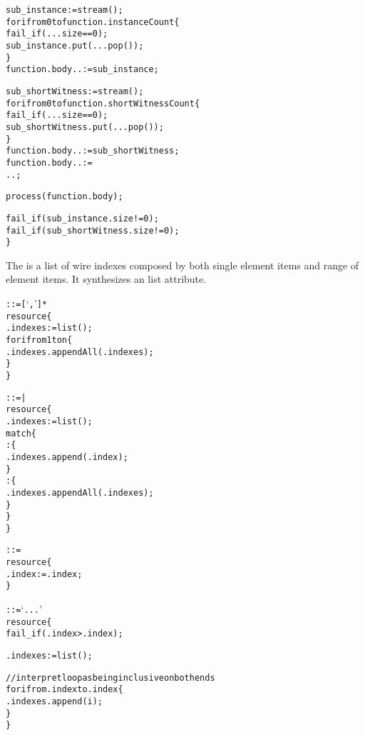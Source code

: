 \begin{alltt}
    sub_instance := stream();
    for i from 0 to function.instanceCount \{
      fail_if(...size == 0);
      sub_instance.put(...pop());
    \}
    function.body.. := sub_instance;

    sub_shortWitness := stream();
    for i from 0 to function.shortWitnessCount \{
      fail_if(...size == 0);
      sub_shortWitness.put(...pop());
    \}
    function.body.. := sub_shortWitness;
    function.body.. :=
      ..;

    process(function.body);

    fail_if(sub_instance.size != 0);
    fail_if(sub_shortWitness.size != 0);
  \}
\end{alltt}

The  is a list of wire indexes composed by both single element items and range of element items.
It synthesizes an  list attribute.\\

\begin{alltt}\ttSyn
   ::=  [ `,'  ]*\ttSem
  resource \{
    .indexes := list();
    for i from 1 to n \{
      .indexes.appendAll(.indexes);
    \}
  \}\ttSyn
  
   ::=  | \ttSem
  resource \{
    .indexes := list();
    match \{
      : \{
        .indexes.append(.index);
      \}
      : \{
        .indexes.appendAll(.indexes);
      \}
    \}
  \}\ttSyn
  
   ::= \ttSem
  resource \{
    .index := .index;
  \}\ttSyn

   ::=  `...' \ttSem
  resource \{
    fail_if(.index > .index);

    .indexes := list();

    // interpret loop as being inclusive on both ends
    for i from .index to .index \{
      .indexes.append(i);
    \}
  \}
\end{alltt}

